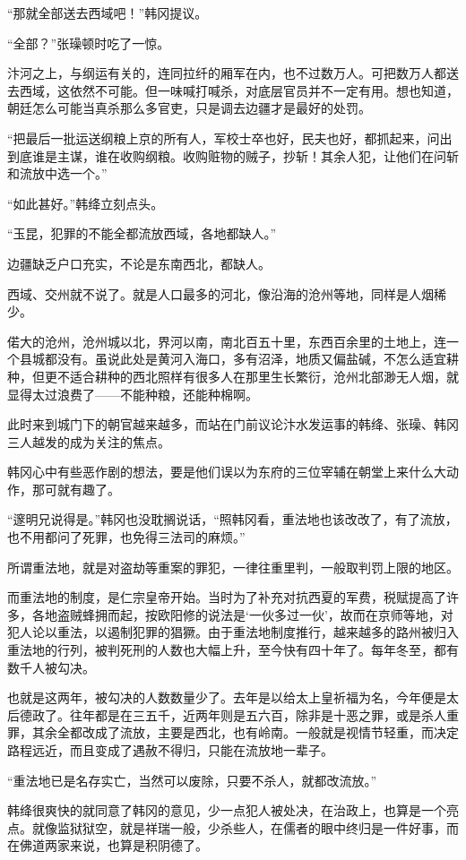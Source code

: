 “那就全部送去西域吧！”韩冈提议。

“全部？”张璪顿时吃了一惊。

汴河之上，与纲运有关的，连同拉纤的厢军在内，也不过数万人。可把数万人都送去西域，这依然不可能。但一味喊打喊杀，对底层官员并不一定有用。想也知道，朝廷怎么可能当真杀那么多官吏，只是调去边疆才是最好的处罚。

“把最后一批运送纲粮上京的所有人，军校士卒也好，民夫也好，都抓起来，问出到底谁是主谋，谁在收购纲粮。收购赃物的贼子，抄斩！其余人犯，让他们在问斩和流放中选一个。”

“如此甚好。”韩绛立刻点头。

“玉昆，犯罪的不能全都流放西域，各地都缺人。”

边疆缺乏户口充实，不论是东南西北，都缺人。

西域、交州就不说了。就是人口最多的河北，像沿海的沧州等地，同样是人烟稀少。

偌大的沧州，沧州城以北，界河以南，南北百五十里，东西百余里的土地上，连一个县城都没有。虽说此处是黄河入海口，多有沼泽，地质又偏盐碱，不怎么适宜耕种，但更不适合耕种的西北照样有很多人在那里生长繁衍，沧州北部渺无人烟，就显得太过浪费了——不能种粮，还能种棉啊。

此时来到城门下的朝官越来越多，而站在门前议论汴水发运事的韩绛、张璪、韩冈三人越发的成为关注的焦点。

韩冈心中有些恶作剧的想法，要是他们误以为东府的三位宰辅在朝堂上来什么大动作，那可就有趣了。

“邃明兄说得是。”韩冈也没耽搁说话，“照韩冈看，重法地也该改改了，有了流放，也不用都问了死罪，也免得三法司的麻烦。”

所谓重法地，就是对盗劫等重案的罪犯，一律往重里判，一般取判罚上限的地区。

而重法地的制度，是仁宗皇帝开始。当时为了补充对抗西夏的军费，税赋提高了许多，各地盗贼蜂拥而起，按欧阳修的说法是‘一伙多过一伙’，故而在京师等地，对犯人论以重法，以遏制犯罪的猖獗。由于重法地制度推行，越来越多的路州被归入重法地的行列，被判死刑的人数也大幅上升，至今快有四十年了。每年冬至，都有数千人被勾决。

也就是这两年，被勾决的人数数量少了。去年是以给太上皇祈福为名，今年便是太后德政了。往年都是在三五千，近两年则是五六百，除非是十恶之罪，或是杀人重罪，其余全都改成了流放，主要是西北，也有岭南。一般就是视情节轻重，而决定路程远近，而且变成了遇赦不得归，只能在流放地一辈子。

“重法地已是名存实亡，当然可以废除，只要不杀人，就都改流放。”

韩绛很爽快的就同意了韩冈的意见，少一点犯人被处决，在治政上，也算是一个亮点。就像监狱狱空，就是祥瑞一般，少杀些人，在儒者的眼中终归是一件好事，而在佛道两家来说，也算是积阴德了。


